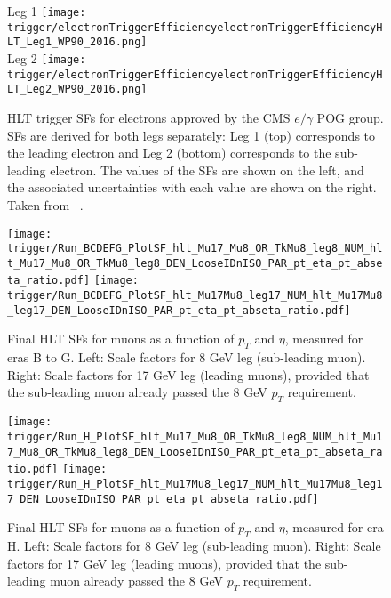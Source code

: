 \begin{figure}[H]
\centering
\subfloat Leg 1
{\texttt{[image: trigger/electronTriggerEfficiencyelectronTriggerEfficiencyHLT\_Leg1\_WP90\_2016.png]} } \\
\subfloat Leg 2
{\texttt{[image: trigger/electronTriggerEfficiencyelectronTriggerEfficiencyHLT\_Leg2\_WP90\_2016.png]} } \\
\caption[HLT trigger SFs for electrons.]{HLT trigger SFs for electrons approved by the CMS $e/ \gamma$ POG group. SFs are derived for both legs separately: Leg 1 (top) corresponds to the leading electron and Leg 2 (bottom) corresponds to the sub-leading electron. The values of the SFs are shown on the left, and the associated uncertainties with each value are shown on the right. Taken from ~\cite{vhbbAN}.}
\label{fig:trigger_eff_diele}
\end{figure}

\begin{figure}[H]
\centering
\texttt{[image: trigger/Run\_BCDEFG\_PlotSF\_hlt\_Mu17\_Mu8\_OR\_TkMu8\_leg8\_NUM\_hlt\_Mu17\_Mu8\_OR\_TkMu8\_leg8\_DEN\_LooseIDnISO\_PAR\_pt\_eta\_pt\_abseta\_ratio.pdf]}
\texttt{[image: trigger/Run\_BCDEFG\_PlotSF\_hlt\_Mu17Mu8\_leg17\_NUM\_hlt\_Mu17Mu8\_leg17\_DEN\_LooseIDnISO\_PAR\_pt\_eta\_pt\_abseta\_ratio.pdf]}\\
\caption[HLT SFs for muons as a function of $p_{T}$ and $\eta$, measured for eras B to G.]{Final HLT SFs for muons as a function of $p_{T}$ and $\eta$, measured for eras B to G. Left: Scale factors for 8 GeV leg (sub-leading muon). Right: Scale factors for 17 GeV leg (leading muons), provided that the sub-leading muon already passed the 8 GeV $p_T$ requirement.}
\label{fig:trigger_SF_dimu_BCDEFG}
\end{figure}

\begin{figure}[H]
\centering
\texttt{[image: trigger/Run\_H\_PlotSF\_hlt\_Mu17\_Mu8\_OR\_TkMu8\_leg8\_NUM\_hlt\_Mu17\_Mu8\_OR\_TkMu8\_leg8\_DEN\_LooseIDnISO\_PAR\_pt\_eta\_pt\_abseta\_ratio.pdf]}
\texttt{[image: trigger/Run\_H\_PlotSF\_hlt\_Mu17Mu8\_leg17\_NUM\_hlt\_Mu17Mu8\_leg17\_DEN\_LooseIDnISO\_PAR\_pt\_eta\_pt\_abseta\_ratio.pdf]}\\
\caption[HLT SFs for muons as a function of $p_{T}$ and $\eta$, measured for era H.]{Final HLT SFs for muons as a function of $p_{T}$ and $\eta$, measured for era H. Left: Scale factors for 8 GeV leg (sub-leading muon). Right: Scale factors for 17 GeV leg (leading muons), provided that the sub-leading muon already passed the 8 GeV $p_T$ requirement.}
\label{fig:trigger_SF_dimu_H}
\end{figure}

